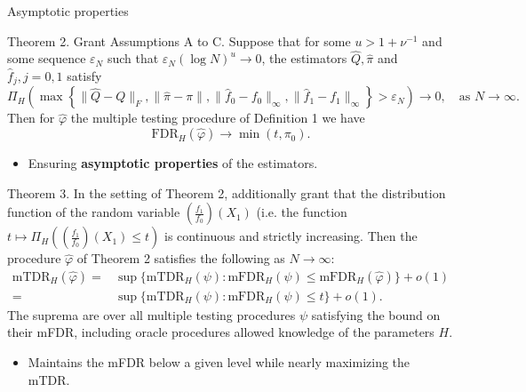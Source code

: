 \documentclass[10pt, aspectratio=169]{beamer}
\begin{document}
\begin{frame}{Asymptotic properties}
   \begin{mytheorembox}{Theorem 2.}
        Grant Assumptions A to C. Suppose that for some \( u > 1 + \nu^{-1} \) and some sequence
        \( \varepsilon_N \) such that \( \varepsilon_N (\log N)^u \to 0 \), the estimators \( \hat{Q}, \hat{\pi} \) and \( \hat{f}_j, j = 0,1 \) satisfy
        \[
        \Pi_H \left( \max \left\{ \|\hat{Q} - Q\|_F, \|\hat{\pi} - \pi\|, \|\hat{f}_0 - f_0\|_\infty, \|\hat{f}_1 - f_1\|_\infty \right\} > \varepsilon_N \right) \to 0, \quad \text{as } N \to \infty.
        \]
        Then for \( \hat{\varphi} \) the multiple testing procedure of Definition 1 we have
        \[
        \text{FDR}_H(\hat{\varphi}) \to \min(t, \pi_0).
        \]
   \end{mytheorembox}
   \vspace{2em}
    \begin{itemize}[label=\scalebox{0.5}{$\blacksquare$}]
        \item Ensuring \textbf{asymptotic properties} of the estimators.
    \end{itemize}
\end{frame}
\begin{frame}
   \begin{mytheorembox}{Theorem 3.}
        In the setting of Theorem 2, additionally grant that the distribution function of the
        random variable \( \left( \frac{f_1}{f_0} \right) (X_1) \) (i.e. the function \( t \mapsto \Pi_H \left( \left( \frac{f_1}{f_0} \right) (X_1) \leq t \right) \) is continuous and strictly
        increasing. Then the procedure \( \hat{\varphi} \) of Theorem 2 satisfies the following as \( N \to \infty \):
        \begin{equation*}
            \begin{split}
            \text{mTDR}_H(\hat{\varphi}) = &\sup \{ \text{mTDR}_H(\psi) : \text{mFDR}_H(\psi) \leq \text{mFDR}_H(\hat{\varphi}) \} + o(1) \\
            = &\sup \{ \text{mTDR}_H(\psi) : \text{mFDR}_H(\psi) \leq t \} + o(1).
            \end{split}
        \end{equation*}
        The suprema are over all multiple testing procedures \( \psi \) satisfying the bound on their mFDR, including
        oracle procedures allowed knowledge of the parameters \( H \).
    \end{mytheorembox}
    \begin{itemize}[label=\scalebox{0.5}{$\blacksquare$}]
    \item Maintains the mFDR below a given level while nearly maximizing the mTDR.
    \end{itemize}
\end{frame}
\end{document}

